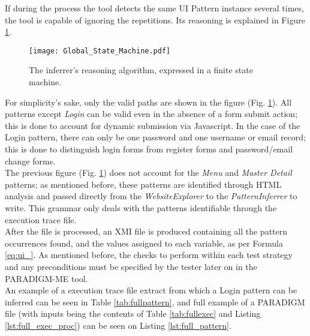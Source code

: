 If during the process the tool detects the same UI Pattern instance several times, the tool is capable of ignoring the repetitions. Its reasoning is explained in Figure \ref{fig:inferrer}.\\

\begin{figure}[!htb]
\centering
\texttt{[image: Global\_State\_Machine.pdf]}
\caption{The inferrer's reasoning algorithm, expressed in a finite state machine.}
\label{fig:inferrer}
\end{figure}

For simplicity's sake, only the valid paths are shown in the figure (Fig. \ref{fig:inferrer}). All patterns except \textit{Login} can be valid even in the absence of a form submit action; this is done to account for dynamic submission via Javascript. In the case of the Login pattern, there can only be one password and one username or email record; this is done to distinguish login forms from register forms and password/email change forms.\\

The previous figure (Fig. \ref{fig:inferrer}) does not account for the \textit{Menu} and \textit{Master Detail} patterns; as mentioned before, these patterns are identified through HTML analysis and passed directly from the \textit{WebsiteExplorer} to the \textit{PatternInferrer} to write. This grammar only deals with the patterns identifiable through the execution trace file.\\

After the file is processed, an XMI file is produced containing all the pattern occurrences found, and the values assigned to each variable, as per Formula \ref{eq:ui_}. As mentioned before, the checks to perform within each test strategy and any preconditions must be specified by the tester later on in the PARADIGM-ME tool.\\

An example of a execution trace file extract from which a Login pattern can be inferred can be seen in Table \ref{tab:fullpattern}, and full example of a PARADIGM file (with inputs being  the contents of Table \ref{tab:fullexec} and Listing \ref{lst:full_exec_proc}) can be seen on Listing \ref{lst:full_pattern}.

